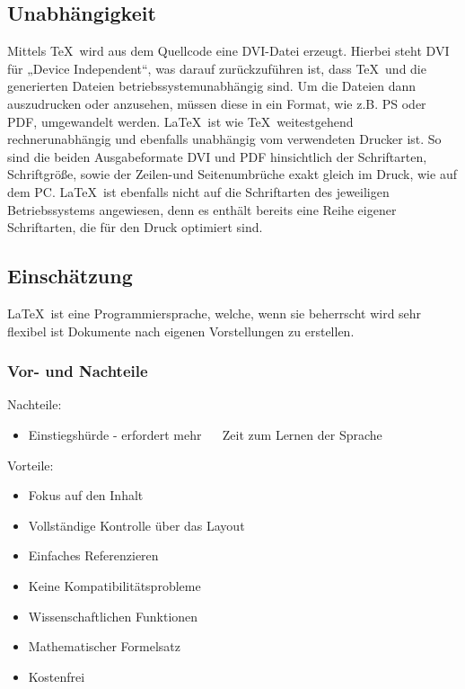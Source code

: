 \subsection{Unabhängigkeit}
Mittels \TeX\ wird aus dem Quellcode eine DVI-Datei
erzeugt. Hierbei steht DVI für „Device Independent“, was darauf zurückzuführen
ist, dass \TeX\ und die generierten Dateien betriebssystemunabhängig sind. Um die
Dateien dann auszudrucken oder anzusehen, müssen diese in ein Format, wie z.B.
PS oder PDF, umgewandelt werden. \LaTeX\ ist wie \TeX\ weitestgehend rechnerunabhängig und ebenfalls unabhängig vom verwendeten Drucker ist. So sind die beiden Ausgabeformate DVI und PDF hinsichtlich der Schriftarten, Schriftgröße, sowie der Zeilen-und Seitenumbrüche exakt gleich im Druck, wie auf dem PC. 
\LaTeX\ ist ebenfalls nicht auf die Schriftarten des jeweiligen Betriebssystems angewiesen, denn es enthält bereits eine Reihe eigener Schriftarten, die für den Druck optimiert sind.
\cite[vgl.][S.45f]{Oechsner2015}

\subsection{Einschätzung}
\LaTeX\ ist eine Programmiersprache, welche, wenn sie beherrscht wird sehr flexibel ist Dokumente nach eigenen Vorstellungen zu erstellen.

\subsubsection{Vor- und Nachteile}
\begin{minipage}[t]{0.42\linewidth}
Nachteile: 
\begin{itemize}
    \item Einstiegshürde - erfordert mehr \,\,\,\,\,\, Zeit zum Lernen der Sprache
\end{itemize}
\end{minipage}
\begin{minipage}[t]{0.48\linewidth}
Vorteile: 
\begin{itemize}
\item Fokus auf den Inhalt 
\item Vollständige Kontrolle über das Layout
\item Einfaches Referenzieren
\item Keine Kompatibilitätsprobleme
    \item Wissenschaftlichen Funktionen
    \item Mathematischer Formelsatz 
    \item Kostenfrei 
\end{itemize}
\end{minipage}
